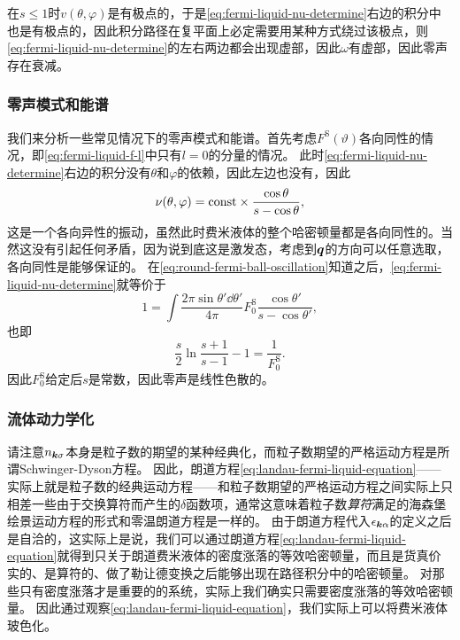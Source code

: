 在$s \leq 1$时$v(\theta, \varphi)$是有极点的，于是\eqref{eq:fermi-liquid-nu-determine}右边的积分中也是有极点的，因此积分路径在复平面上必定需要用某种方式绕过该极点，则\eqref{eq:fermi-liquid-nu-determine}的左右两边都会出现虚部，因此$\omega$有虚部，因此零声存在衰减。


\subsubsection{零声模式和能谱}

我们来分析一些常见情况下的零声模式和能谱。首先考虑$F^\text{S}(\vartheta)$各向同性的情况，即\eqref{eq:fermi-liquid-f-l}中只有$l=0$的分量的情况。
此时\eqref{eq:fermi-liquid-nu-determine}右边的积分没有$\theta$和$\varphi$的依赖，因此左边也没有，因此
\begin{equation}
    \nu(\theta, \varphi) = \mathrm{const} \times \frac{\cos \theta}{s - \cos \theta},
    \label{eq:round-fermi-ball-oscillation}
\end{equation}
这是一个各向异性的振动，虽然此时费米液体的整个哈密顿量都是各向同性的。当然这没有引起任何矛盾，因为说到底这是激发态，考虑到$\vb*{q}$的方向可以任意选取，各向同性是能够保证的。
在\eqref{eq:round-fermi-ball-oscillation}知道之后，\eqref{eq:fermi-liquid-nu-determine}就等价于
\[
    1 = \int \frac{2 \pi \sin \theta' \dd{\theta'}}{4\pi} F^\text{S}_0 \frac{\cos \theta'}{s - \cos \theta'},
\]
也即
\begin{equation}
    \frac{s}{2} \ln\frac{s+1}{s-1} - 1 = \frac{1}{F^\text{S}_0}.
\end{equation}
因此$F^\text{S}_0$给定后$s$是常数，因此零声是线性色散的。

\subsubsection{流体动力学化}

请注意$n_{\vb*{k} \sigma}$本身是粒子数的期望的某种经典化，而粒子数期望的严格运动方程是所谓Schwinger-Dyson方程。
因此，朗道方程\eqref{eq:landau-fermi-liquid-equation}——实际上就是粒子数的经典运动方程——和粒子数期望的严格运动方程之间实际上只相差一些由于交换算符而产生的$\delta$函数项，通常这意味着粒子数\emph{算符}满足的海森堡绘景运动方程的形式和零温朗道方程是一样的。
由于朗道方程代入$\epsilon_{\vb*{k} \alpha}$的定义之后是自洽的，这实际上是说，我们可以通过朗道方程\eqref{eq:landau-fermi-liquid-equation}就得到只关于朗道费米液体的密度涨落的等效哈密顿量，而且是货真价实的、是算符的、做了勒让德变换之后能够出现在路径积分中的哈密顿量。
对那些只有密度涨落才是重要的的系统，实际上我们确实只需要密度涨落的等效哈密顿量。
因此通过观察\eqref{eq:landau-fermi-liquid-equation}，我们实际上可以将费米液体玻色化。

